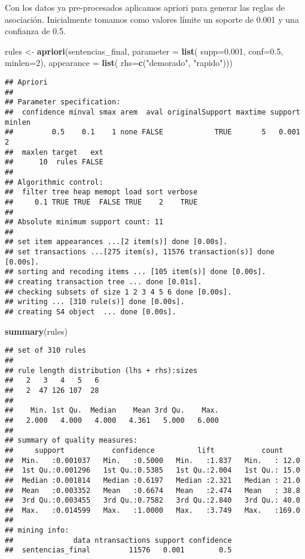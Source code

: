\documentclass[runningheads,a4paper]{llncs}
\newenvironment{Shaded}{}{}
\newcommand{\KeywordTok}[1]{\textcolor[rgb]{0.00,0.44,0.13}{\textbf{{#1}}}}
\newcommand{\DataTypeTok}[1]{\textcolor[rgb]{0.56,0.13,0.00}{{#1}}}
\newcommand{\DecValTok}[1]{\textcolor[rgb]{0.25,0.63,0.44}{{#1}}}
\newcommand{\FloatTok}[1]{\textcolor[rgb]{0.25,0.63,0.44}{{#1}}}
\newcommand{\StringTok}[1]{\textcolor[rgb]{0.25,0.44,0.63}{{#1}}}
\newcommand{\NormalTok}[1]{{#1}}
\begin{document}
Con los datos ya pre-procesados aplicamos apriori para generar las
reglas de asociación. Inicialmente tomamos como valores límite un
soporte de 0.001 y una confianza de 0.5.

\begin{Shaded}
\begin{Highlighting}[]
\NormalTok{rules <-}\StringTok{ }\KeywordTok{apriori}\NormalTok{(sentencias_final, }\DataTypeTok{parameter =} \KeywordTok{list}\NormalTok{(}
  \DataTypeTok{supp=}\FloatTok{0.001}\NormalTok{, }\DataTypeTok{conf=}\FloatTok{0.5}\NormalTok{, }\DataTypeTok{minlen=}\DecValTok{2}\NormalTok{), }\DataTypeTok{appearance =} \KeywordTok{list}\NormalTok{(}
    \DataTypeTok{rhs=}\KeywordTok{c}\NormalTok{(}\StringTok{"demorado"}\NormalTok{, }\StringTok{"rapido"}\NormalTok{)))}
\end{Highlighting}
\end{Shaded}

\begin{verbatim}
## Apriori
## 
## Parameter specification:
##  confidence minval smax arem  aval originalSupport maxtime support minlen
##         0.5    0.1    1 none FALSE            TRUE       5   0.001      2
##  maxlen target   ext
##      10  rules FALSE
## 
## Algorithmic control:
##  filter tree heap memopt load sort verbose
##     0.1 TRUE TRUE  FALSE TRUE    2    TRUE
## 
## Absolute minimum support count: 11 
## 
## set item appearances ...[2 item(s)] done [0.00s].
## set transactions ...[275 item(s), 11576 transaction(s)] done [0.00s].
## sorting and recoding items ... [105 item(s)] done [0.00s].
## creating transaction tree ... done [0.01s].
## checking subsets of size 1 2 3 4 5 6 done [0.00s].
## writing ... [310 rule(s)] done [0.00s].
## creating S4 object  ... done [0.00s].
\end{verbatim}

\begin{Shaded}
\begin{Highlighting}[]
\KeywordTok{summary}\NormalTok{(rules)}
\end{Highlighting}
\end{Shaded}

\begin{verbatim}
## set of 310 rules
## 
## rule length distribution (lhs + rhs):sizes
##   2   3   4   5   6 
##   2  47 126 107  28 
## 
##    Min. 1st Qu.  Median    Mean 3rd Qu.    Max. 
##   2.000   4.000   4.000   4.361   5.000   6.000 
## 
## summary of quality measures:
##     support           confidence          lift           count      
##  Min.   :0.001037   Min.   :0.5000   Min.   :1.837   Min.   : 12.0  
##  1st Qu.:0.001296   1st Qu.:0.5385   1st Qu.:2.004   1st Qu.: 15.0  
##  Median :0.001814   Median :0.6197   Median :2.321   Median : 21.0  
##  Mean   :0.003352   Mean   :0.6674   Mean   :2.474   Mean   : 38.8  
##  3rd Qu.:0.003455   3rd Qu.:0.7582   3rd Qu.:2.840   3rd Qu.: 40.0  
##  Max.   :0.014599   Max.   :1.0000   Max.   :3.749   Max.   :169.0  
## 
## mining info:
##              data ntransactions support confidence
##  sentencias_final         11576   0.001        0.5
\end{verbatim}
\end{document}

